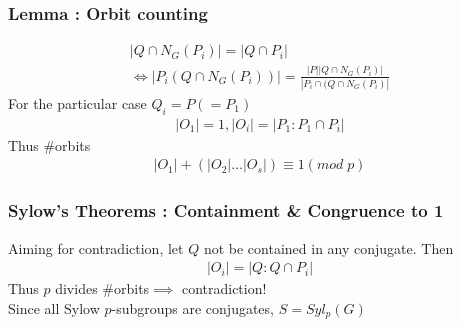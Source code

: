 \documentclass{beamer}
\begin{document}
\begin{frame}
    \frametitle{Lemma : Orbit counting}
    \begin{gather*}
        |Q\cap N_G(P_i)| = |Q\cap P_i|\\
        \iff |P_i(Q\cap N_G(P_i))| = \frac{|P||Q\cap N_G(P_i)|}{|P_i\cap(Q\cap N_G(P_i)|}
    \end{gather*}
    For the particular case $Q_i = P (= P_1)$
    \begin{gather*}
        |O_1| = 1, |O_i| = |P_1:P_1\cap P_i|
    \end{gather*}
    Thus \#orbits
    \begin{gather*}
        |O_1| + (|O_2|\dots|O_s|)\equiv 1 (mod\;p)
    \end{gather*}
\end{frame}

\begin{frame}
    \frametitle{Sylow's Theorems : Containment \& Congruence to 1}
    Aiming for contradiction, let $Q$ not be contained in any conjugate.
    Then
    \begin{gather*}
        |O_i| = |Q:Q\cap P_i|
    \end{gather*}
    Thus $p$ divides \#orbits$\implies$ contradiction!\\
    \vspace{10mm}
    Since all Sylow $p$-subgroups are conjugates, $S = Syl_p(G)$

\end{frame}
\end{document}
